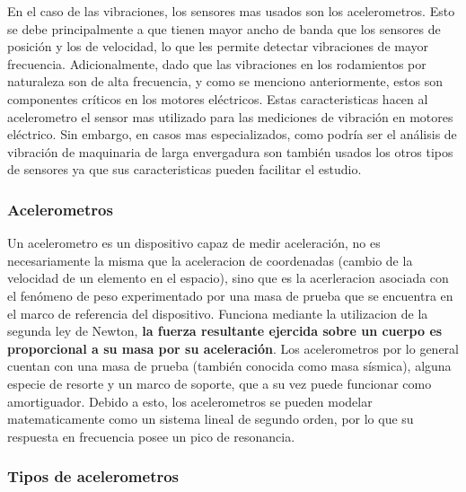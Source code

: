 En el caso de las vibraciones, los sensores mas usados son los
acelerometros.  Esto se debe principalmente a que tienen mayor ancho de banda
que los sensores de posición y los de velocidad, lo que les permite detectar
vibraciones de mayor frecuencia. Adicionalmente, dado que las vibraciones en los
rodamientos por naturaleza son de alta frecuencia, y como se menciono anteriormente,
estos son componentes críticos en los motores eléctricos.
Estas caracteristicas hacen al acelerometro el sensor mas utilizado para las
mediciones de vibración en motores eléctrico. Sin embargo,
en casos mas especializados, como podría ser el análisis de vibración
de maquinaria de larga envergadura son también usados los otros tipos de
sensores ya que sus caracteristicas pueden facilitar el estudio.


\subsubsection{Acelerometros}

Un acelerometro es un dispositivo capaz de medir aceleración, no es
necesariamente la misma que la aceleracion de coordenadas (cambio de la velocidad de
un elemento en el espacio), sino que es la acerleracion asociada con el fenómeno
de peso experimentado por una masa de prueba que se
encuentra en el marco de referencia del dispositivo.  Funciona mediante
la utilizacion de la segunda ley de Newton, \textbf{la fuerza resultante
ejercida sobre un cuerpo es proporcional a su masa por su aceleración}. Los
acelerometros por lo general cuentan con una masa de prueba (también conocida
como masa sísmica), alguna especie de resorte y un marco de soporte, que a su
vez puede funcionar como amortiguador. Debido a esto, los acelerometros se
pueden modelar matematicamente como un sistema lineal de segundo orden,
por lo que su respuesta en frecuencia posee un pico de resonancia.


\subsubsection*{Tipos de acelerometros}


